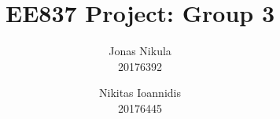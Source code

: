 \documentclass{article}
\title{EE837 Project: Group 3} %
\author{Jonas Nikula \\ 20176392 \and Nikitas Ioannidis \\ 20176445} %
\date{} %
\begin{document}
\maketitle %






\printbibliography{}




\end{document}
